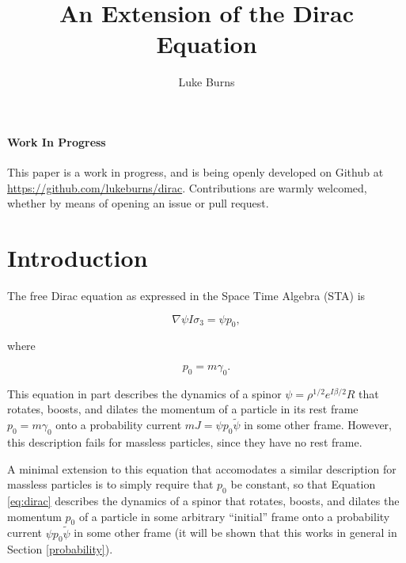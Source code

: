 \documentclass{article}
\title{An Extension of the Dirac Equation}
\author{Luke Burns}
\begin{document}
  \maketitle


  \paragraph{Work In Progress} This paper is a work in progress, and is being openly developed on Github at \url{https://github.com/lukeburns/dirac}. Contributions are warmly welcomed, whether by means of opening an issue or pull request.

  \section{Introduction}

  The free Dirac equation as expressed in the Space Time Algebra (STA) is\cite{gap}

  \begin{equation}
    \nabla \psi I \sigma_3 = \psi p_0, \label{eq:dirac}
  \end{equation}

  where

  \begin{equation}
    p_0 = m \gamma_0. \label{eq:mass}
  \end{equation} 

  This equation in part describes the dynamics of a spinor $\psi = \rho^{1/2} e^{I \beta/2}R$ that rotates, boosts, and dilates the momentum of a particle in its rest frame $p_0 = m \gamma_0$ onto a probability current $mJ = \psi p_0 \widetilde \psi$ in some other frame. However, this description fails for massless particles, since they have no rest frame.

  A minimal extension to this equation that accomodates a similar description for massless particles is to simply require that $p_0$ be constant, so that Equation \ref{eq:dirac} describes the dynamics of a spinor that rotates, boosts, and dilates the momentum $p_0$ of a particle in some arbitrary ``initial'' frame onto a probability current $\psi p_0 \widetilde \psi$ in some other frame (it will be shown that this works in general in Section \ref{probability}).
\end{document}
